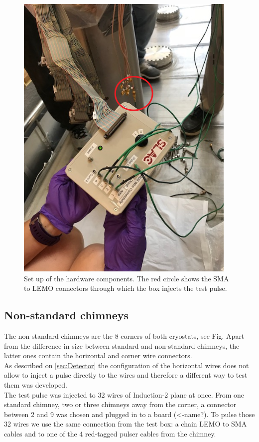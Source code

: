 \begin{enumerate}
\begin{figure}[H]
\centering
\includegraphics[scale=0.6]{fig/setup}
\caption{Set up of the hardware components. The red circle shows the SMA to LEMO connectors through which the box injects the test pulse.}
\end{figure}




\end{enumerate}




\subsection{Non-standard chimneys}
\label{ssec:nonStd_chimn}

The non-standard chimneys are the 8 corners of both cryostats, see Fig. Apart from the difference in size between standard and non-standard chimneys, the latter ones contain the horizontal and corner wire connectors. \\

As described on \cref{sec:Detector} the configuration of the horizontal wires does not allow to inject a pulse directly to the wires and therefore a different way to test them was developed. \\
The test pulse was injected to 32 wires of Induction-2 plane at once. From one standard chimney, two or three chimneys away from the corner, a connector between 2 and 9 was chosen and plugged in to a board (<-name?). To pulse those 32 wires we use the same connection from the test box: a chain LEMO to SMA cables and to one of the 4 red-tagged pulser cables from the chimney.  

